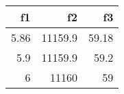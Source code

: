 \begin{tabular}{rrr}
\hline
   f1 &      f2 &    f3 \\
\hline
 5.86 & 11159.9 & 59.18 \\
 5.9  & 11159.9 & 59.2  \\
 6    & 11160   & 59    \\
\hline
\end{tabular}